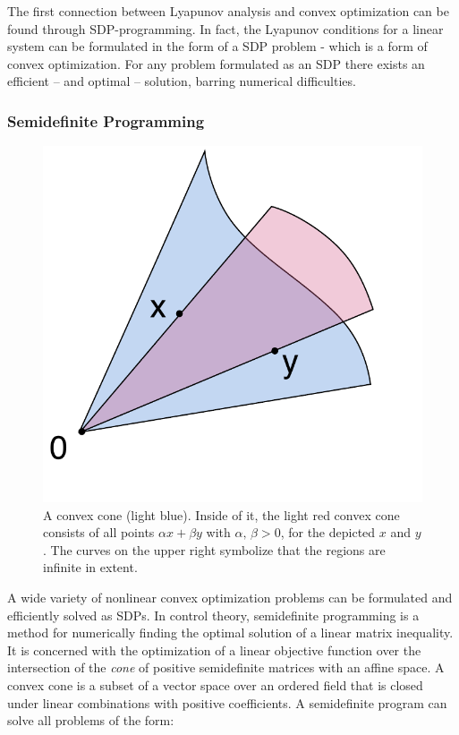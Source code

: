 The first connection between Lyapunov analysis and convex optimization can be
found through \ac{SDP}-programming. In fact, the Lyapunov conditions for a
linear system can be formulated in the form of a \ac{SDP} problem - which is a
form of convex optimization. For any problem formulated as an \ac{SDP} there
exists an efficient -- and optimal -- solution, barring numerical difficulties.

\subsubsection{Semidefinite Programming}
\label{subsec:sdp}

\begin{figure}
  \centering
  \includegraphics[scale=.5]{figures/preliminaries/Convex_cone_illust}
  \caption[A convex cone illustrated]{A convex cone (light blue). Inside of it, the light red convex cone
    consists of all points \(\alpha x + \beta y \) with \(\alpha,\, \beta > 0\),
    for the depicted \(x\) and \(y\). The curves on the upper right symbolize
    that the regions are infinite in extent.
    \cite{alexandrovConvexConeIllust2019}}
\end{figure}


A wide variety of nonlinear convex optimization problems can be formulated and
efficiently solved as \ac{SDP}s. In control theory, semidefinite programming is
a method for numerically finding the optimal solution of a linear matrix
inequality. It is concerned with the optimization of a linear objective function
over the intersection of the \textit{cone} of positive semidefinite matrices
with an affine space. A convex cone is a subset of a vector space over an
ordered field that is closed under linear combinations with positive
coefficients. A semidefinite program can solve all problems of the form:

